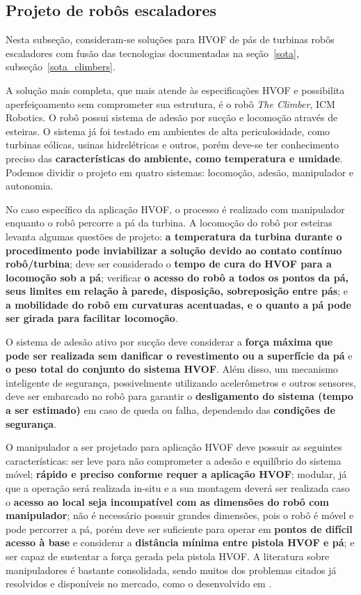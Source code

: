 \subsection{Projeto de robôs escaladores}\label{proj_climbers}

Nesta subseção, consideram-se soluções para HVOF de pás de turbinas robôs
escaladores com fusão das tecnologias documentadas na
seção~\ref{sota}, subseção~\ref{sota_climbers}.

A solução mais completa, que mais atende às especificações HVOF e possibilita
aperfeiçoamento sem comprometer sua estrutura, é o robô \emph{The Climber}, ICM
Robotics. O robô possui sistema de adesão por sucção e locomoção através de
esteiras. O sistema já foi testado em ambientes de alta periculosidade, como
turbinas eólicas, usinas hidrelétricas e outros, porém deve-se ter conhecimento
preciso das \textbf{características do ambiente, como temperatura e umidade}.
Podemos dividir o projeto em quatro sistemas: locomoção, adesão, manipulador e
autonomia.

No caso específico da aplicação HVOF, o processo é realizado com
manipulador enquanto o robô percorre a pá da turbina. A locomoção do
robô por esteiras levanta algumas questões de projeto: \textbf{a temperatura da
turbina durante o procedimento pode inviabilizar a solução devido ao contato
contínuo robô/turbina}; deve ser considerado o \textbf{tempo de cura do HVOF
para a locomoção sob a pá}; verificar \textbf{o acesso do robô a todos os pontos
da pá, seus limites em relação à parede, disposição, sobreposição entre pás}; e
\textbf{a mobilidade do robô em curvaturas acentuadas, e o quanto a pá pode ser
girada para facilitar locomoção}.

O sistema de adesão ativo por sucção deve considerar a \textbf{força máxima que
pode ser realizada sem danificar o revestimento ou a superfície da pá} e
\textbf{o peso total do conjunto do sistema HVOF}. Além disso, um mecanismo
inteligente de segurança, possivelmente utilizando acelerômetros e outros
sensores, deve ser embarcado no robô para garantir o \textbf{desligamento do
sistema (tempo a ser estimado)} em caso de queda ou falha, dependendo das
\textbf{condições de segurança}.

O manipulador a ser projetado para aplicação HVOF deve possuir as seguintes
características: ser leve para não comprometer a adesão e equilíbrio do sistema
móvel; \textbf{rápido e preciso conforme requer a aplicação HVOF}; modular, já que a operação será realizada
in-situ e a sua montagem deverá ser realizada caso o \textbf{acesso ao local seja
incompatível com as dimensões do robô com manipulador}; não é necessário
possuir grandes dimensões, pois o robô é móvel e pode percorrer a pá,
porém deve ser suficiente para operar em \textbf{pontos de difícil acesso à
base} e considerar a \textbf{distância mínima entre pistola HVOF e pá}; e ser
capaz de sustentar a força gerada pela pistola HVOF. A literatura
sobre manipuladores é bastante consolidada, sendo muitos dos problemas citados
já resolvidos e disponíveis no mercado, como o desenvolvido em
\cite{manzdevelopment}.

